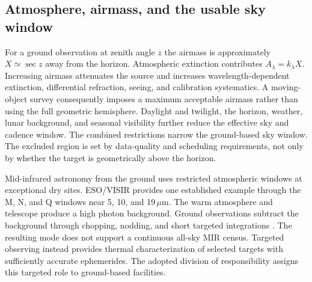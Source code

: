\subsection{Atmosphere, airmass, and the usable sky window}

For a ground observation at zenith angle $z$ the airmass is approximately
$X\simeq\sec z$ away from the horizon. Atmospheric extinction contributes
$A_\lambda=k_\lambda X$. Increasing airmass attenuates the source and
increases wavelength-dependent extinction, differential refraction, seeing,
and calibration systematics. A moving-object survey consequently
imposes a maximum acceptable airmass rather than using the full geometric
hemisphere. Daylight and twilight, the horizon, weather, lunar background,
and seasonal visibility further reduce the effective sky and cadence window.
The combined restrictions narrow the ground-based sky window. The excluded
region is set by data-quality and scheduling requirements, not only by
whether the target is geometrically above the horizon.

Mid-infrared astronomy from the ground uses restricted atmospheric windows
at exceptional dry sites. ESO/VISIR provides one established example through
the M, N, and Q windows near 5, 10, and 19\,$\mu$m. The warm atmosphere and
telescope produce a high photon background. Ground observations subtract
the background through chopping, nodding, and short targeted integrations
\cite{ESOVISIR2019}. The resulting mode does not support a continuous
all-sky MIR census. Targeted observing instead provides thermal
characterization of selected targets with sufficiently accurate ephemerides.
The adopted division of
responsibility assigns this targeted role to ground-based facilities.

